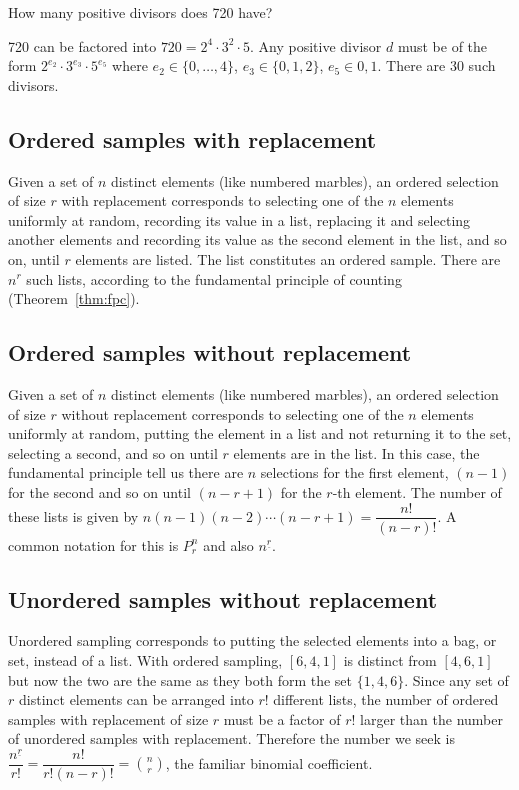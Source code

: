 \documentclass[../main.tex]{subfiles}
\begin{document}
\begin{example}
	How many positive divisors does 720 have?
\end{example}
\begin{solution}
	720 can be factored into $720 = 2^4 \cdot 3^2 \cdot 5$. Any positive divisor $d$ must
	be of the form $2^{e_2}\cdot 3^{e_3}\cdot 5^{e_5}$ where $e_2 \in \{0,\ldots,4\}$,
	$e_3 \in \{0,1,2\}$, $e_5 \in {0,1}$. There are 30 such divisors.
\end{solution}

\subsection{Ordered samples with replacement}
Given a set of $n$ distinct elements (like numbered marbles), an
ordered selection of size $r$ with replacement corresponds to selecting
one of the $n$ elements uniformly at random, recording its value in a list,
replacing it and selecting another elements and recording its value as the 
second element in the list, and so on, until $r$ elements are listed. The list
constitutes an ordered sample. There are $n^r$ such lists, according to
the fundamental principle of counting (Theorem~\ref{thm:fpc}).
\subsection{Ordered samples without replacement}
Given a set of $n$ distinct elements (like numbered marbles), an
ordered selection of size $r$ without replacement corresponds to selecting
one of the $n$ elements uniformly at random, putting the element in a 
list and not returning it to the set, selecting a second, and so on until $r$ elements
are in the list. In this case, the fundamental principle tell us there are $n$ selections
for the first element, $(n-1)$ for the second and so on until $(n-r+1)$ for the $r$-th
element. The number of these lists is given by $n(n-1)(n-2)\cdots(n-r+1) = \dfrac{n!}{(n-r)!}$.
A common notation for this is $P^n_r$ and also $n^{\underline{r}}$.
\subsection{Unordered samples without replacement}
Unordered sampling corresponds to putting the selected elements into a
bag, or set, instead of a list. With ordered sampling, $[6,4,1]$ is distinct from $[4,6,1]$ but now
the two are the same as they both form the set $\{1,4,6\}.$ Since any set of $r$ distinct
elements can be arranged into $r!$ different lists, the number of ordered samples with replacement of size $r$ must be a factor of $r!$ larger than the number of unordered samples
with replacement. Therefore the number we seek is $
\dfrac{n^{\underline{r}}}{r!} = \dfrac{n!}{r!(n-r)!}
 = \displaystyle {n \choose r}$, the familiar binomial coefficient.
\end{document}
